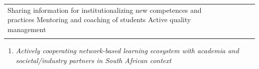 \documentclass[
  11pt,
]{article}
\providecommand{\tightlist}{%
  \setlength{\itemsep}{0pt}\setlength{\parskip}{0pt}}
\begin{document}
\begin{longtable}[c]{|p{1.68in}|p{1.68in}|p{1.68in}|p{1.68in}}
\linebreak  Sharing information for institutionalizing new competences and practices \linebreak  \linebreak  Mentoring and coaching of students \linebreak  \linebreak  Active quality management}}} \\

\noalign{\global\setlength{\arrayrulewidth}{2pt}}\arrayrulecolor[HTML]{666666}\cline{1-4}

\end{longtable}

\begin{enumerate}
\def\labelenumi{\arabic{enumi}.}
\setcounter{enumi}{2}
\tightlist
\item
  \emph{Actively cooperating network-based learning ecosystem with
  academia and societal/industry partners in South African context}
\end{enumerate}

\providecommand{\docline}[3]{\noalign{\global\setlength{\arrayrulewidth}{#1}}\arrayrulecolor[HTML]{#2}\cline{#3}}

\setlength{\tabcolsep}{2pt}

\renewcommand*{\arraystretch}{1.5}
\end{document}

